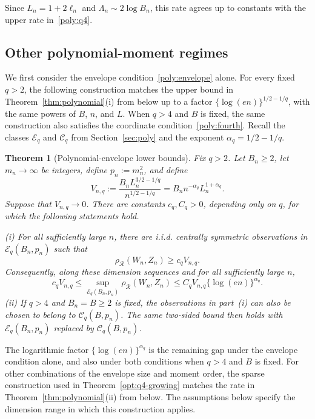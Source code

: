 \documentclass[11pt,letterpaper]{article}
\newenvironment{recovered}{}{}
\newtheorem{theorem}{Theorem}
\theoremstyle{remark}
\newcommand{\rh}{\rho_{\mathcal R}}
\begin{document}
Since \(L_n=1+2\ell_n\) and \(\Lambda_n\sim2\log B_n\), this rate
agrees up to constants with the upper rate in~\eqref{poly:q4}.

\subsection{Other polynomial-moment regimes}

\begin{recovered}
We first consider the envelope condition~\eqref{poly:envelope} alone.
{For every fixed \(q>2\), the following construction
matches the upper bound in Theorem~\ref{thm:polynomial}\textup{(i)}
from below up to a factor \(\{\log(en)\}^{1/2-1/q}\), with the same
powers of \(B\), \(n\), and \(L\).} When \(q>4\) and \(B\) is fixed, the same
construction also satisfies the coordinate condition~\eqref{poly:fourth}.
Recall the classes \(\mathcal E_q\) and \(\mathcal C_q\) from
Section~\ref{sec:poly} and the exponent \(\alpha_q=1/2-1/q\).

\begin{theorem}[Polynomial-envelope lower bounds]\label{lower:dense}
Fix \(q>2\). Let \(B_n\ge2\), let \(m_n\to\infty\) be integers,
{define} \(p_n:=m_n^2\), and define
\[
 V_{n,q}:=\frac{B_nL_n^{3/2-1/q}}{n^{1/2-1/q}}
         =B_n n^{-\alpha_q}L_n^{1+\alpha_q}.
\]
Suppose that \(V_{n,q}\to0\). There are constants \(c_q,C_q>0\),
depending only on \(q\), for which the following statements hold.

\noindent\textup{(i)} For all sufficiently large \(n\), there are
i.i.d. centrally symmetric observations in
\(\mathcal E_q(B_n,p_n)\) such that
\begin{equation}
 \rh(W_n,Z_n)\ge c_q V_{n,q}.
 \label{lower:dense-rate}
\end{equation}
Consequently, along these dimension sequences and for all
sufficiently large \(n\),
\[
 c_q V_{n,q}
 \le\sup_{\mathcal E_q(B_n,p_n)}\rh(W_n,Z_n)
 \le C_q V_{n,q}\{\log(en)\}^{\alpha_q}.
\]
\noindent\textup{(ii)} If \(q>4\) and \(B_n=B\ge2\) is fixed,
the observations in part~\textup{(i)} can also be chosen to belong
to \(\mathcal C_q(B,p_n)\). The same two-sided bound then holds
with \(\mathcal E_q(B_n,p_n)\) replaced by \(\mathcal C_q(B,p_n)\).
\end{theorem}

The logarithmic factor \(\{\log(en)\}^{\alpha_q}\) is the remaining
gap under the envelope condition alone, and also under both conditions
when \(q>4\) and \(B\) is fixed. For other combinations of the
envelope size and moment order, the sparse construction used in
Theorem~\ref{opt:q4-growing} matches the rate in
Theorem~\ref{thm:polynomial}\textup{(ii)} from below.
The assumptions below specify the dimension range in which this
construction applies.
\end{recovered}
\end{document}
